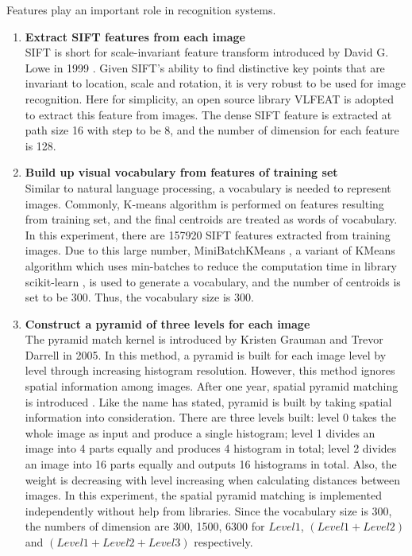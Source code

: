 Features play an important role in recognition systems.


\begin{enumerate}
	\item {\bfseries Extract SIFT features from each image}
	\\SIFT is short for scale-invariant feature transform introduced by David G. Lowe in 1999 \cite{lowe1999object}. Given SIFT's ability to find distinctive key points that are invariant to location, scale and rotation, it is very robust to be used for image recognition. Here for simplicity, an open source library VLFEAT \cite{vedaldi08vlfeat} is adopted to extract this feature from images. The dense SIFT feature is extracted at path size 16 with step to be 8, and the number of dimension for each feature is 128.

	\item {\bfseries Build up visual vocabulary from features of training set}
  \\Similar to natural language processing, a vocabulary is needed to represent images. Commonly, K-means algorithm is performed on features resulting from training set, and the final centroids are treated as words of vocabulary. In this experiment, there are 157920 SIFT features extracted from training images. Due to this large number, MiniBatchKMeans \cite{sculley2010web}, a variant of KMeans algorithm which uses min-batches to reduce the computation time in library scikit-learn \cite{scikit-learn}, is used to generate a vocabulary, and the number of centroids is set to be 300. Thus, the vocabulary size is 300.

	\item {\bfseries Construct a pyramid of three levels for each image}
  \\The pyramid match kernel is introduced by Kristen Grauman and Trevor Darrell \cite{grauman2005pyramid} in 2005. In this method, a pyramid is built for each image level by level through increasing histogram resolution. However, this method ignores spatial information among images. After one year, spatial pyramid matching is introduced \cite{lazebnik2006beyond}. Like the name has stated, pyramid is built by taking spatial information into consideration. There are three levels built: level 0 takes the whole image as input and produce a single histogram; level 1 divides an image into 4 parts equally and produces 4 histogram in total; level 2 divides an image into 16 parts equally and outputs 16 histograms in total. Also, the weight is decreasing with level increasing when calculating distances between images. In this experiment, the spatial pyramid matching is implemented independently without help from libraries. Since the vocabulary size is 300, the numbers of dimension are 300, 1500, 6300 for $Level 1$, $(Level 1 + Level 2)$ and $(Level 1 + Level 2 + Level 3)$ respectively.


\end{enumerate}
